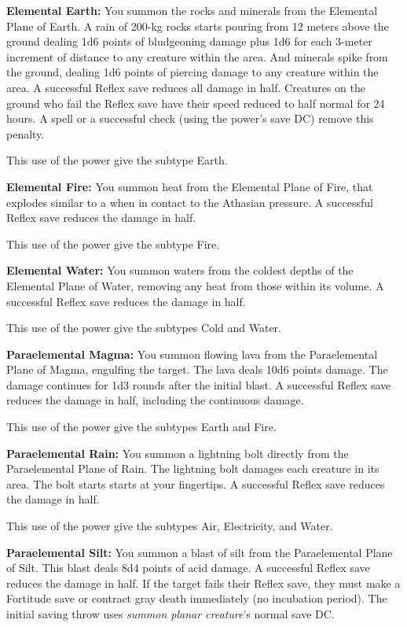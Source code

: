 {	\textbf{Elemental Earth:} You summon the rocks and minerals from the Elemental Plane of Earth. A rain of 200-kg rocks starts pouring from 12 meters above the ground dealing 1d6 points of bludgeoning damage plus 1d6 for each 3-meter increment of distance to any creature within the area. And minerals spike from the ground, dealing 1d6 points of piercing damage to any creature within the area. A successful Reflex save reduces all damage in half. Creatures on the ground who fail the Reflex save have their speed reduced to half normal for 24 hours. A  spell or a successful  check (using the power's save DC) remove this penalty.

	This use of the power give the subtype Earth.

	\textbf{Elemental Fire:} You summon heat from the Elemental Plane of Fire, that explodes similar to a  when in contact to the Athasian pressure. A successful Reflex save reduces the damage in half.

	This use of the power give the subtype Fire.

	\textbf{Elemental Water:} You summon waters from the coldest depths of the Elemental Plane of Water, removing any heat from those within its volume. A successful Reflex save reduces the damage in half.

	This use of the power give the subtypes Cold and Water.

	\textbf{Paraelemental Magma:} You summon flowing lava from the Paraelemental Plane of Magma, engulfing the target. The lava deals 10d6 points damage. The damage continues for 1d3 rounds after the initial blast. A successful Reflex save reduces the damage in half, including the continuous damage.

	This use of the power give the subtypes Earth and Fire.

	\textbf{Paraelemental Rain:} You summon a lightning bolt directly from the Paraelemental Plane of Rain. The lightning bolt damages each creature in its area. The bolt starts starts at your fingertips. A successful Reflex save reduces the damage in half.

	This use of the power give the subtypes Air, Electricity, and Water.

	\textbf{Paraelemental Silt:} You summon a blast of silt from the Paraelemental Plane of Silt. This blast deals 8d4 points of acid damage. A successful Reflex save reduces the damage in half. If the target fails their Reflex save, they must make a Fortitude save or contract gray death immediately (no incubation period). The initial saving throw uses \emph{summon planar creature}'s normal save DC.

}
